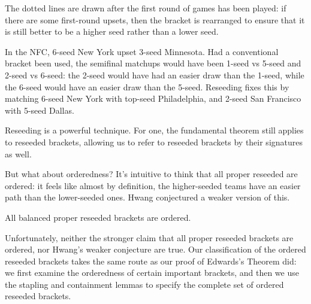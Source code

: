 {

The dotted lines are drawn after the first round of games has been played: if there are some first-round upsets, then the bracket is rearranged to ensure that it is still better to be a higher seed rather than a lower seed.


In the NFC, 6-seed New York upset 3-seed Minnesota. Had a conventional bracket been used, the semifinal matchups would have been 1-seed vs 5-seed and 2-seed vs 6-seed: the 2-seed would have had an easier draw than the 1-seed, while the 6-seed would have an easier draw than the 5-seed. Reseeding fixes this by matching 6-seed New York with top-seed Philadelphia, and 2-seed San Francisco with 5-seed Dallas.

Reseeding is a powerful technique. For one, the fundamental theorem still applies to reseeded brackets, allowing us to refer to reseeded brackets by their signatures as well.


But what about orderedness? It's intuitive to think that all proper reseeded are ordered: it feels like almost by definition, the higher-seeded teams have an easier path than the lower-seeded ones. Hwang \cite{reseeding} conjectured a weaker version of this.

\begin{conj}{}{}
    All balanced proper reseeded brackets are ordered.
\end{conj}

Unfortunately, neither the stronger claim that all proper reseeded brackets are ordered, nor Hwang's weaker conjecture are true. Our classification of the ordered reseeded brackets takes the same route as our proof of Edwards's Theorem did: we first examine the orderedness of certain important brackets, and then we use the stapling and containment lemmas to specify the complete set of ordered reseeded brackets.

}
